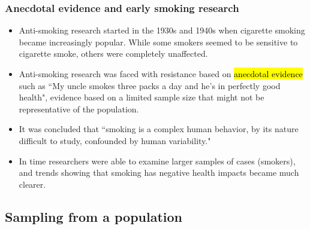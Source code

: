 \documentclass[slidestop,compress,mathserif]{beamer}
\begin{document}
\begin{frame}
	\frametitle{Anecdotal evidence and early smoking research}

	\begin{itemize}
	\setlength\leftskip{-2em}

	\item Anti-smoking research started in the 1930s and 1940s when cigarette smoking became increasingly popular. While some smokers seemed to be sensitive to cigarette smoke, others were completely unaffected.

	\item Anti-smoking research was faced with resistance based on \hl{anecdotal evidence} such as ``My uncle smokes three packs a day and he's in perfectly good health", evidence based on a limited sample size that might not be representative of the population.

	\item It was concluded that ``smoking is a complex human behavior, by its nature difficult to study, confounded by human variability."

	\item In time researchers were able to examine larger samples of cases (smokers), and trends showing that smoking has negative health impacts became much clearer.

	\end{itemize}


\end{frame}


\subsection{Sampling from a population}

\end{document}
